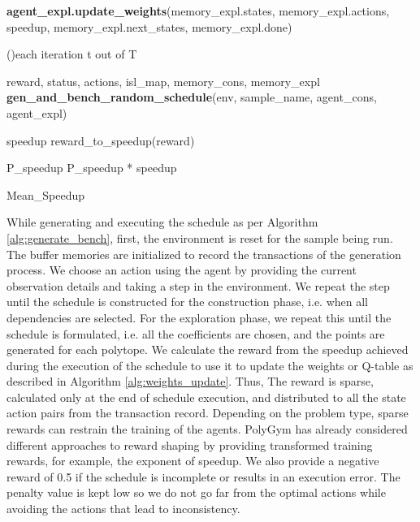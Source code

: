 \documentclass[logo,msc]{infthesis}           %
\begin{document}
\begin{algorithm}[H]
{{         \textbf{agent\_expl.update\_weights}(memory\_expl.states,
                                    memory\_expl.actions,
                                    speedup, memory\_expl.next\_states,
                                    memory\_expl.done)
       
    }
}

\For(){each iteration t out of T}
{
        reward, status, actions, isl\_map, memory\_cons, memory\_expl \gets \textbf{gen\_and\_bench\_random\_schedule}(env, sample\_name, agent\_cons, agent\_expl)
        
        speedup \gets reward\_to\_speedup(reward)
        
        P\_speedup \gets P\_speedup * speedup
        
}

Mean\_Speedup \gets {}

\end{algorithm}

While generating and executing the schedule as per Algorithm \ref{alg:generate_bench}, first, the environment is reset for the sample being run. The buffer memories are initialized to record the transactions of the generation process. We choose an action using the agent by providing the current observation details and taking a step in the environment. We repeat the step until the schedule is constructed for the construction phase, i.e. when all dependencies are selected. For the exploration phase, we repeat this until the schedule is formulated, i.e. all the coefficients are chosen, and the points are generated for each polytope. We calculate the reward from the speedup achieved during the execution of the schedule to use it to update the weights or Q-table as described in Algorithm \ref{alg:weights_update}. Thus, The reward is sparse, calculated only at the end of schedule execution, and distributed to all the state action pairs from the transaction record. Depending on the problem type, sparse rewards can restrain the training of the agents. PolyGym has already considered different approaches to reward shaping by providing transformed training rewards, for example, the exponent of speedup\cite{Wiewiora2010}. We also provide a negative reward of 0.5 if the schedule is incomplete or results in an execution error. The penalty value is kept low so we do not go far from the optimal actions while avoiding the actions that lead to inconsistency.
\end{document}
